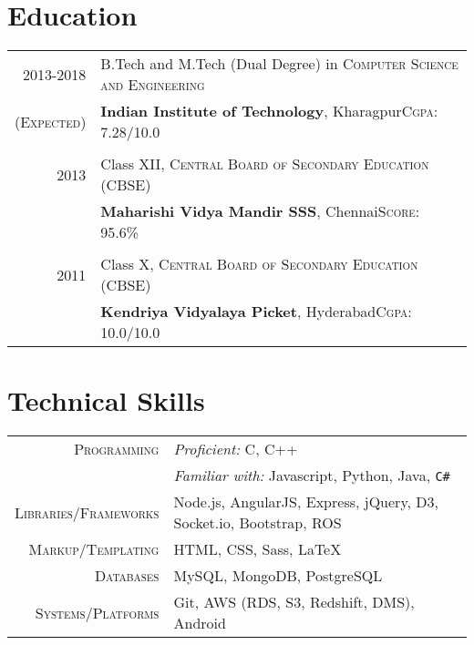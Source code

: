 \documentclass[a4paper,10pt]{extarticle} %
\begin{document}

\section{Education}

\begin{tabular}{r|p{16cm}}	
2013-2018 & B.Tech and M.Tech (Dual Degree) in \textsc{Computer Science and Engineering}\\
\textsc{(Expected)}&\textbf{Indian Institute of Technology}, Kharagpur\hfill\textsc{Cgpa}: 7.28/10.0\\
&\\


2013& Class XII, \textsc{}\textsc{Central Board of Secondary Education (CBSE)} \\
&\normalsize\textbf{Maharishi Vidya Mandir SSS}, Chennai\hfill\textsc{Score}: 95.6\%\\
&\\


2011 & Class X, \textsc{}\textsc{Central Board of Secondary Education (CBSE)} \\
&\normalsize\textbf{Kendriya Vidyalaya Picket}, Hyderabad\hfill\textsc{Cgpa}: 10.0/10.0\\

\end{tabular}


\section{Technical Skills}

\begin{tabular}{r|p{16cm}}
\textsc{Programming} & {\itshape{Proficient:}} C, C++\\
& {\itshape{Familiar with:}} Javascript, Python, Java, \verb!C#! \\
\textsc{Libraries/Frameworks} & Node.js, AngularJS, Express, jQuery, D3, Socket.io, Bootstrap, ROS\\
\textsc{Markup/Templating} & HTML, CSS, Sass, \LaTeX\\
\textsc{Databases} & MySQL, MongoDB, PostgreSQL\\
\textsc{Systems/Platforms} & Git, AWS (RDS, S3, Redshift, DMS), Android\\
\end{tabular}
\end{document}

